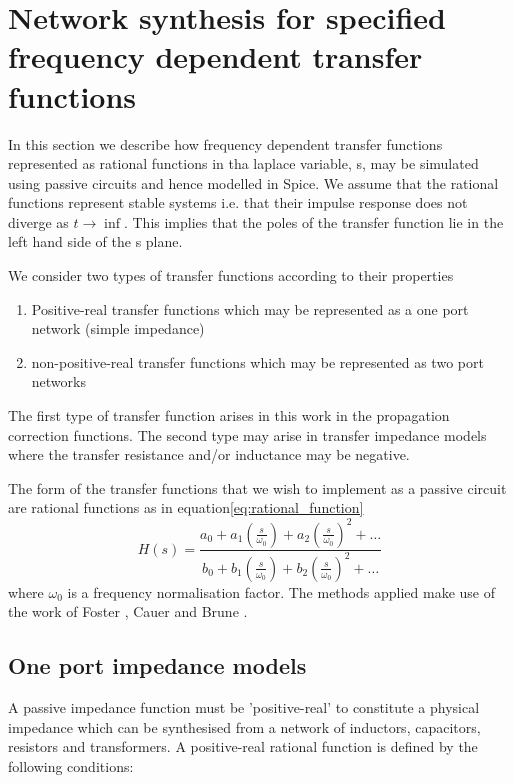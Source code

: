 \section{Network synthesis for specified frequency dependent transfer functions} \label{network_synthesis}

In this section we describe how frequency dependent transfer functions represented as rational functions in tha laplace variable, s, may be simulated using passive circuits and hence modelled in Spice. We assume that the rational functions represent stable systems i.e. that their impulse response does not diverge as $t\rightarrow \inf$. This implies that the poles of the transfer function lie in the left hand side of the s plane.

We consider two types of transfer functions according to their properties
\begin{enumerate}
\item Positive-real transfer functions which may be represented as a one port network (simple impedance)
\item non-positive-real transfer functions which may be represented as two port networks
\end{enumerate}
%
The first type of transfer function arises in this work in the propagation correction functions. The second type may arise in transfer impedance models where the transfer resistance and/or inductance may be negative.

The form of the transfer functions that we wish to implement as a passive circuit are rational functions as in equation\ref{eq:rational_function}
%
\begin{equation} \label{eq:rational_function}
H\left(s\right)=\frac{a_{0}+a_{1}\left(\frac{s}{\omega_{0}}\right)+a_{2}\left(\frac{s}{\omega_{0}}\right)^{2}+\dots}{b_{0}+b_{1}\left(\frac{s}{\omega_{0}}\right)+b_{2}\left(\frac{s}{\omega_{0}}\right)^{2}+\dots}
\end{equation}
%
where $\omega_{0}$ is a frequency normalisation factor.
The methods applied make use of the work of Foster \cite{Foster}, Cauer\cite{Cauer} and Brune \cite{Brune}.

\subsection{One port impedance models}\label{one_port_imepdance_models}

A passive impedance function must be 'positive-real' to constitute a physical impedance which can be synthesised from a network of inductors, capacitors, resistors and transformers. A positive-real rational function is defined by the following conditions:

